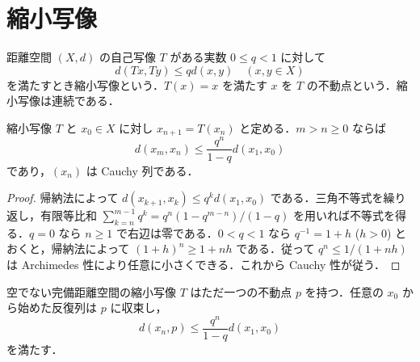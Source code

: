 \section{縮小写像}
\begin{defn}[縮小写像と不動点]
距離空間 $(X,d)$ の自己写像 $T$ がある実数 $0\leq q<1$ に対して
\[
 d(Tx,Ty)\leq qd(x,y)\quad(x,y\in X)
\]
を満たすとき縮小写像という．$T(x)=x$ を満たす $x$ を $T$ の不動点という．縮小写像は連続である．
\end{defn}
\begin{prop}[縮小反復の距離評価]
縮小写像 $T$ と $x_0\in X$ に対し $x_{n+1}=T(x_n)$ と定める．$m>n\geq0$ ならば
\[
 d(x_m,x_n)\leq\frac{q^n}{1-q}d(x_1,x_0)
\]
であり，$(x_n)$ は Cauchy 列である．
\end{prop}
\begin{proof}
帰納法によって $d(x_{k+1},x_k)\leq q^k d(x_1,x_0)$ である．三角不等式を繰り返し，有限等比和 $\sum_{k=n}^{m-1}q^k=q^n(1-q^{m-n})/(1-q)$ を用いれば不等式を得る．$q=0$ なら $n\geq1$ で右辺は零である．$0<q<1$ なら $q^{-1}=1+h$ ($h>0$) とおくと，帰納法によって $(1+h)^n\geq1+nh$ である．従って $q^n\leq1/(1+nh)$ は Archimedes 性により任意に小さくできる．これから Cauchy 性が従う．
\end{proof}
\begin{prop}[Banachの不動点定理]
空でない完備距離空間の縮小写像 $T$ はただ一つの不動点 $p$ を持つ．任意の $x_0$ から始めた反復列は $p$ に収束し，
\[
 d(x_n,p)\leq \frac{q^n}{1-q}d(x_1,x_0)
\]
を満たす．
\end{prop}
